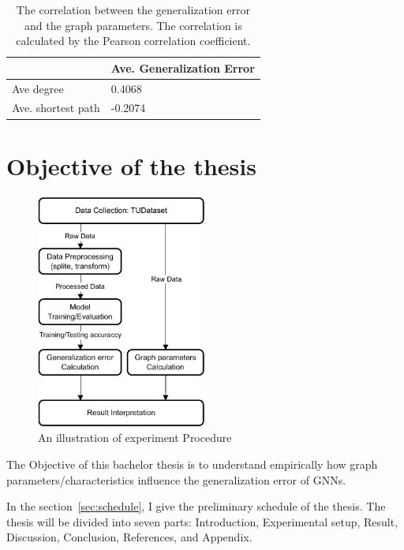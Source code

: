 \documentclass{article}
\begin{document}
\begin{table}[ht]
    \centering
    \begin{tabular}{@{}ll@{}}
    \toprule
                       & Ave. Generalization Error \\ \midrule
    Ave degree            & 0.4068                    \\
    Ave. shortest path & -0.2074                   \\ \bottomrule
    \end{tabular}
    \caption{The correlation between the generalization error and the graph parameters. The correlation is calculated by the Pearson correlation coefficient.}
    \label{tab:correlation}
    \end{table}

\newpage

\section{Objective of the thesis}

\begin{figure}[h!]
    \centering
    \includegraphics[width=0.5\textwidth]{experiment_procedure.pdf}
    \caption{An illustration of experiment Procedure}
    \label{fig:experiment}
\end{figure}

The Objective of this bachelor thesis is to understand empirically how graph parameters/characteristics influence the generalization error of GNNs. 

In the section~\ref{sec:schedule}, I give the preliminary schedule of the thesis. The thesis will be divided into seven parts: Introduction, Experimental setup, Result, Discussion, Conclusion, References, and Appendix. 
\end{document}
